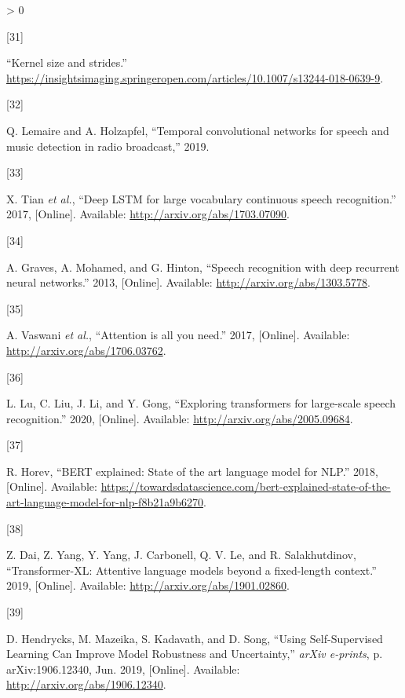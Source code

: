 \documentclass[
  a4paper,
]{article}
\newlength{\cslhangindent}
\newlength{\csllabelwidth}
\newenvironment{CSLReferences}[2] %
 {%
  \setlength{\parindent}{0pt}
  \ifodd #1 \everypar{\setlength{\hangindent}{\cslhangindent}}\ignorespaces\fi
  \ifnum #2 > 0
  \setlength{\parskip}{#2\baselineskip}
  \fi
 }%
 {}
\newcommand{\CSLLeftMargin}[1]{\parbox[t]{\csllabelwidth}{#1}}
\newcommand{\CSLRightInline}[1]{\parbox[t]{\linewidth - \csllabelwidth}{#1}\break}
\begin{document}
\begin{CSLReferences}{0}{0}
\leavevmode\hypertarget{ref-kernel}{}%
\CSLLeftMargin{{[}31{]} }
\CSLRightInline{{``Kernel size and strides.''}
\url{https://insightsimaging.springeropen.com/articles/10.1007/s13244-018-0639-9}.}

\leavevmode\hypertarget{ref-lemaire2019temporal}{}%
\CSLLeftMargin{{[}32{]} }
\CSLRightInline{Q. Lemaire and A. Holzapfel, {``Temporal convolutional
networks for speech and music detection in radio broadcast,''} 2019.}

\leavevmode\hypertarget{ref-tian2017deep}{}%
\CSLLeftMargin{{[}33{]} }
\CSLRightInline{X. Tian \emph{et al.}, {``Deep LSTM for large vocabulary
continuous speech recognition.''} 2017, {[}Online{]}. Available:
\url{http://arxiv.org/abs/1703.07090}.}

\leavevmode\hypertarget{ref-graves2013speech}{}%
\CSLLeftMargin{{[}34{]} }
\CSLRightInline{A. Graves, A. Mohamed, and G. Hinton, {``Speech
recognition with deep recurrent neural networks.''} 2013, {[}Online{]}.
Available: \url{http://arxiv.org/abs/1303.5778}.}

\leavevmode\hypertarget{ref-vaswani2017attention}{}%
\CSLLeftMargin{{[}35{]} }
\CSLRightInline{A. Vaswani \emph{et al.}, {``Attention is all you
need.''} 2017, {[}Online{]}. Available:
\url{http://arxiv.org/abs/1706.03762}.}

\leavevmode\hypertarget{ref-lu2020exploring}{}%
\CSLLeftMargin{{[}36{]} }
\CSLRightInline{L. Lu, C. Liu, J. Li, and Y. Gong, {``Exploring
transformers for large-scale speech recognition.''} 2020, {[}Online{]}.
Available: \url{http://arxiv.org/abs/2005.09684}.}

\leavevmode\hypertarget{ref-towardsdatasience}{}%
\CSLLeftMargin{{[}37{]} }
\CSLRightInline{R. Horev, {``BERT explained: State of the art language
model for NLP.''} 2018, {[}Online{]}. Available:
\url{https://towardsdatascience.com/bert-explained-state-of-the-art-language-model-for-nlp-f8b21a9b6270}.}

\leavevmode\hypertarget{ref-dai2019transformerxl}{}%
\CSLLeftMargin{{[}38{]} }
\CSLRightInline{Z. Dai, Z. Yang, Y. Yang, J. Carbonell, Q. V. Le, and R.
Salakhutdinov, {``Transformer-XL: Attentive language models beyond a
fixed-length context.''} 2019, {[}Online{]}. Available:
\url{http://arxiv.org/abs/1901.02860}.}

\leavevmode\hypertarget{ref-2019arXiv190612340H}{}%
\CSLLeftMargin{{[}39{]} }
\CSLRightInline{D. Hendrycks, M. Mazeika, S. Kadavath, and D. Song,
{``{Using Self-Supervised Learning Can Improve Model Robustness and
Uncertainty},''} \emph{arXiv e-prints}, p. arXiv:1906.12340, Jun. 2019,
{[}Online{]}. Available: \url{http://arxiv.org/abs/1906.12340}.}


\end{CSLReferences}
\end{document}
